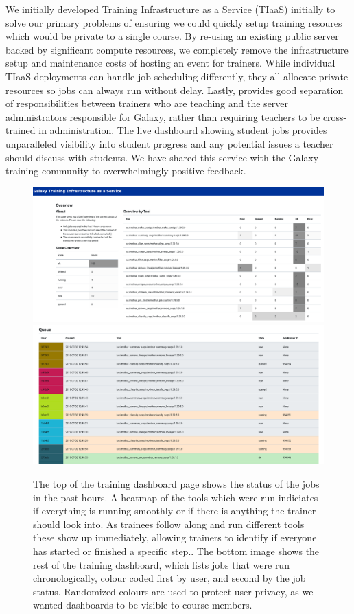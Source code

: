 \documentclass[a4paper,num-refs]{oup-contemporary}
\begin{document}
We initially developed Training Infrastructure as a Service (TIaaS) initially to solve our primary problems of ensuring we could quickly setup training resoures which would be private to a single course. By re-using an existing public server backed by significant compute resources, we completely remove the infrastructure setup and maintenance costs of hosting an event for trainers. While individual TIaaS deployments can handle job scheduling differently, they all allocate private resources so jobs can always run without delay. Lastly, provides good separation of responsibilities between trainers who are teaching and the server administrators responsible for Galaxy, rather than requiring teachers to be cross-trained in administration. The live dashboard showing student jobs provides unparalleled visibility into student progress and any potential issues a teacher should discuss with students. We have shared this service with the Galaxy training community to overwhelmingly positive feedback.

\begin{figure}[bt!]
\centering
\includegraphics[width=\linewidth]{images/dashboard.png}
\includegraphics[width=\linewidth]{images/queue.png}
\caption{The top of the training dashboard page shows the status of the jobs in the past hours. A heatmap of the tools which were run indiciates if everything is running smoothly or if there is anything the trainer should look into. As trainees follow along and run different tools these show up immediately, allowing trainers to identify if everyone has started or finished a specific step.. The bottom image shows the rest of the training dashboard, which lists jobs that were run chronologically, colour coded first by user, and second by the job status. Randomized colours are used to protect user privacy, as we wanted dashboards to be visible to course members.}\label{figure:dashboard}
\end{figure}
\end{document}
